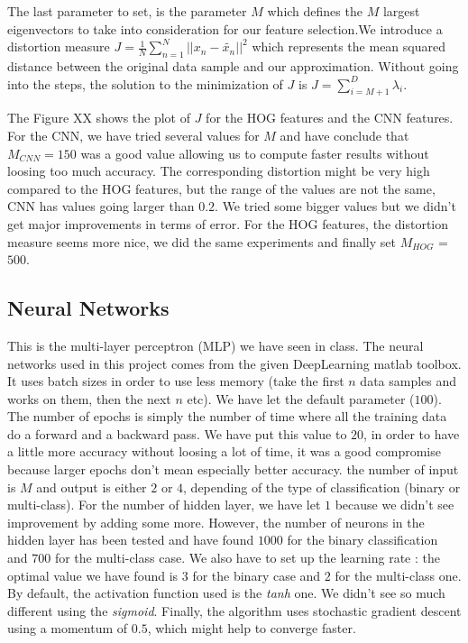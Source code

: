 \documentclass{article} %
\begin{document}
The last parameter to set, is the parameter $M$ which defines the $M$ largest eigenvectors to take into consideration for our feature selection.We introduce a distortion measure $J = \frac{1}{N}\sum_{n=1}^{N}||x_n-\tilde{x_n}||^2$ which represents the mean squared distance between the original data sample and our approximation. Without going into the steps, the solution to the minimization of $J$ is $J = \sum_{i=M+1}^D \lambda_i$. 

The Figure XX shows the plot of $J$ for the HOG features and the CNN features. For the CNN, we have tried several values for $M$ and have conclude that $M_{CNN} = 150$ was a good value allowing us to compute faster results without loosing too much accuracy. The corresponding distortion might be very high compared to the HOG features, but the range of the values are not the same, CNN has values going larger than $0.2$. We tried some bigger values but we didn't get major improvements in terms of error. For the HOG features, the distortion measure seems more nice, we did the same experiments and finally set $M_{HOG}$ = $500$. 

\subsection{Neural Networks}

This is the multi-layer perceptron (MLP) we have seen in class. The neural networks used in this project comes from the given DeepLearning matlab toolbox. It uses batch sizes in order to use less memory (take the first $n$ data samples and works on them, then the next $n$ etc). We have let the default parameter ($100$). The number of epochs is simply the number of time where all the training data do a forward and a backward pass. We have put this value to $20$, in order to have a little more accuracy without loosing a lot of time, it was a good compromise because larger epochs don't mean especially better accuracy. the number of input is $M$ and output is either $2$ or $4$, depending of the type of classification (binary or multi-class). For the number of hidden layer, we have let $1$ because we didn't see improvement by adding some more. However, the number of neurons in the hidden layer has been tested and have found $1000$ for the binary classification and $700$ for the multi-class case. We also have to set up the learning rate : the optimal value we have found is $3$ for the binary case and $2$ for the multi-class one. By default, the activation function used is the \textit{tanh} one. We didn't see so much different using the \textit{sigmoid}. Finally, the algorithm uses stochastic gradient descent using a momentum of $0.5$, which might help to converge faster.
\end{document}
